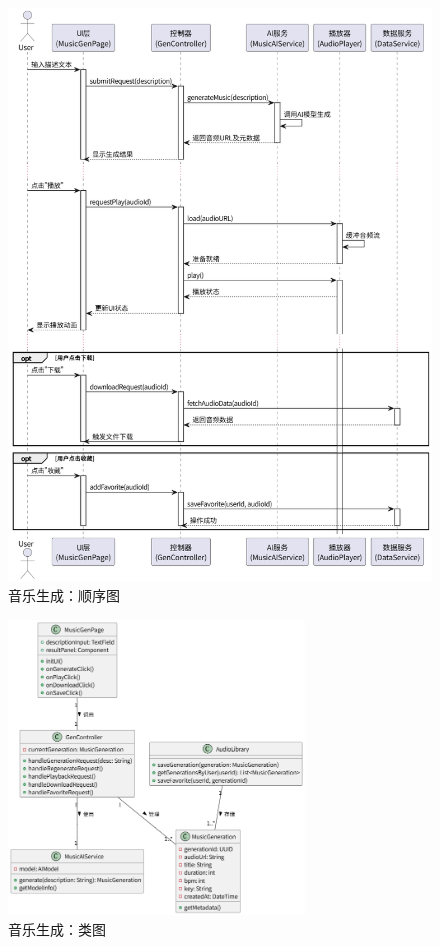 \documentclass{base}
\numberwithin{figure}{section} %
\begin{document}
\begin{figure}[H]
    \centering
    \includegraphics[width=\textwidth]{images/gen-1.png}
    \caption{音乐生成：顺序图}
\end{figure}

\begin{figure}[H]
    \centering
    \includegraphics[width=0.7\textwidth]{images/gen-2.png}
    \caption{音乐生成：类图}
\end{figure}
\end{document}
